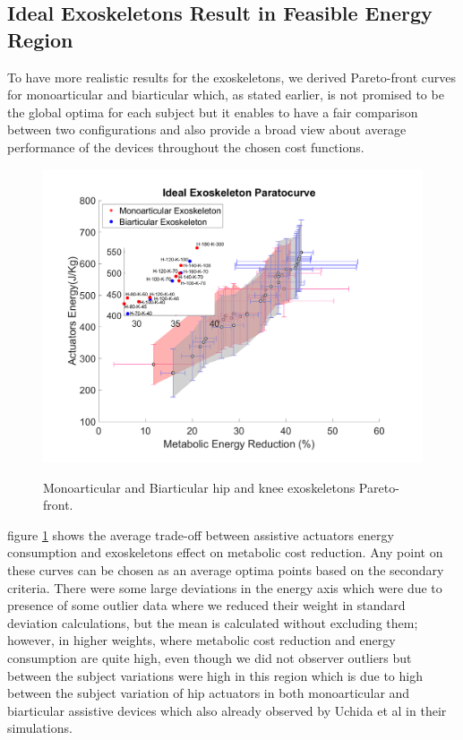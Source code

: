 \documentclass[10pt,letterpaper]{article}
\begin{document}
\subsection*{Ideal Exoskeletons Result in Feasible Energy Region}
To have more realistic results for the exoskeletons, we derived Pareto-front curves for monoarticular and biarticular which, as stated earlier, is not promised to be the global optima for each subject but it enables to have a fair comparison between two configurations and also provide a broad view about average performance of the devices throughout the chosen cost functions.
\begin{figure}[!h]
	\centering
	\vspace{-1.\baselineskip}    
	{\includegraphics[width=\columnwidth]{Ideal_Exo_ParetoOpt_Figures/Paretofront.pdf}}
	\caption{Monoarticular and Biarticular hip and knee exoskeletons Pareto-front.}
	\label{Fig_Paretofront}
\end{figure}
figure \ref{Fig_Paretofront} shows the average trade-off between assistive actuators energy consumption and exoskeletons effect on metabolic cost reduction. Any point on these curves can be chosen as an average optima points based on the secondary criteria.
There were some large deviations in the energy axis which were due to presence of some outlier data where we reduced their weight in standard deviation calculations, but the mean is calculated without excluding them; however, in higher weights, where metabolic cost reduction and energy consumption are quite high, even though we did not observer outliers but between the subject variations were high in this region which is due to high between the subject variation of hip actuators in both monoarticular and biarticular assistive devices which also already observed by Uchida et al \cite{2} in their simulations.\\
\end{document}
